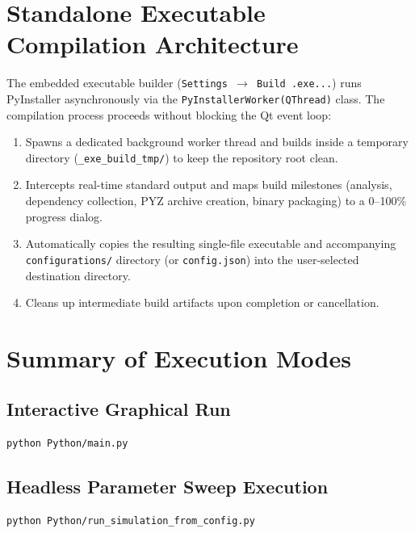 \documentclass[11pt,a4paper]{article}
\begin{document}
\section{Standalone Executable Compilation Architecture}

The embedded executable builder (\texttt{Settings $\rightarrow$ Build .exe...}) runs PyInstaller asynchronously via the \texttt{PyInstallerWorker(QThread)} class. The compilation process proceeds without blocking the Qt event loop:
\begin{enumerate}[nosep]
    \item Spawns a dedicated background worker thread and builds inside a temporary directory (\texttt{\_exe\_build\_tmp/}) to keep the repository root clean.
    \item Intercepts real-time standard output and maps build milestones (analysis, dependency collection, PYZ archive creation, binary packaging) to a 0--100\% progress dialog.
    \item Automatically copies the resulting single-file executable and accompanying \texttt{configurations/} directory (or \texttt{config.json}) into the user-selected destination directory.
    \item Cleans up intermediate build artifacts upon completion or cancellation.
\end{enumerate}

\section{Summary of Execution Modes}

\subsection{Interactive Graphical Run}
\begin{lstlisting}[language=bash]
python Python/main.py
\end{lstlisting}

\subsection{Headless Parameter Sweep Execution}
\begin{lstlisting}[language=bash]
python Python/run_simulation_from_config.py
\end{lstlisting}
\end{document}
